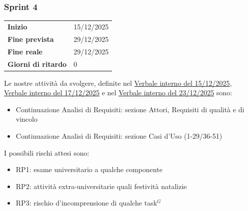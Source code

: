 \subsubsection{Sprint 4}


\begin{tabular}{p{} p{}}
	\textbf{Inizio} & 15/12/2025 \\
	\textbf{Fine prevista} & 29/12/2025 \\
	\textbf{Fine reale} & 29/12/2025\\
	\textbf{Giorni di ritardo} & 0\\
\end{tabular}
\newline \newline 
Le nostre attività da svolgere, definite nel \href{https://nullpointersgroup.github.io/Documentazione/output/RTB/Verbali%20Interni/2025-12-15_verbale_interno.pdf}{Verbale interno del 15/12/2025}, \href{https://nullpointersgroup.github.io/Documentazione/output/RTB/Verbali%20Interni/2025-12-17_verbale_interno.pdf}{Verbale interno del 17/12/2025} e nel \href{https://nullpointersgroup.github.io/Documentazione/output/RTB/Verbali%20Interni/2025-12-23_verbale_interno.pdf}{Verbale interno del 23/12/2025} sono:
\begin{itemize}[itemsep=5pt, parsep=1pt, label=$\scriptstyle\bullet$]
	\item Continuazione Analisi di Requisiti: sezione Attori, Requisiti di qualità e di vincolo
	\item Continuazione Analisi di Requisiti: sezione Casi d’Uso (1-29/36-51)
\end{itemize}


I possibili rischi attesi sono:
\begin{itemize}[itemsep=5pt, parsep=1pt, label=$\scriptstyle\bullet$]
	\item RP1: esame universitario a qualche componente
	\item RP2: attività extra-universitarie quali festività natalizie
	\item RP3: rischio d'incomprensione di qualche task$^G$
\end{itemize}


